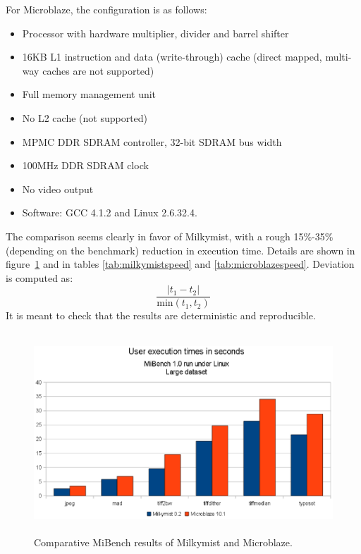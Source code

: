 \documentclass[a4paper,11pt]{kthesis}
\begin{document}
For Microblaze, the configuration is as follows:
\begin{itemize}
\item Processor with hardware multiplier, divider and barrel shifter
\item 16KB L1 instruction and data (write-through) cache (direct mapped, multi-way caches are not supported)
\item Full memory management unit
\item No L2 cache (not supported)
\item MPMC DDR SDRAM controller, 32-bit SDRAM bus width
\item 100MHz DDR SDRAM clock
\item No video output
\item Software: GCC 4.1.2 and Linux 2.6.32.4.
\end{itemize}

The comparison seems clearly in favor of Milkymist, with a rough 15\%-35\% (depending on the benchmark) reduction in execution time. Details are shown in figure~\ref{fig:mmvsmb} and in tables \ref{tab:milkymistspeed} and \ref{tab:microblazespeed}. Deviation is computed as:
\begin{equation}
\frac{|t_{1}-t_{2}|}{\textrm{min}(t_{1}, t_{2})}
\end{equation}
It is meant to check that the results are deterministic and reproducible.

\begin{figure}[htp]
\centering
\includegraphics[height=75mm]{mm_vs_mb.eps}
\caption{Comparative MiBench results of Milkymist and Microblaze.}
\label{fig:mmvsmb}
\end{figure}
\end{document}
